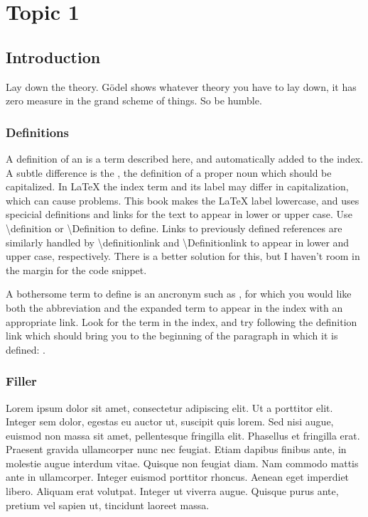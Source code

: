 
\chapter{Topic 1}\label{chap:topic1}

\section{Introduction}\label{sec:topic1-introduction}
Lay down the theory. G{\"o}del shows whatever theory you have to lay down, it has zero measure in the grand scheme of things. So be humble.

\subsection{Definitions}\label{sec:topic1-introduction-definitions}
A definition of an  is a term described here, and automatically added to the index. A subtle difference is the , the definition of a proper noun which should be capitalized. In LaTeX the index term and its label may differ in capitalization, which can cause problems. This book makes the LaTeX label lowercase, and uses specicial definitions and links for the text to appear in lower or upper case. Use \textbackslash definition or \textbackslash Definition to define. Links to previously defined references are similarly handled by \textbackslash definitionlink and \textbackslash Definitionlink to appear in lower and upper case, respectively. There is a better solution for this, but I haven't room in the margin for the code snippet.

A bothersome term to define is an ancronym such as , for which you would like both the abbreviation and the expanded term to appear in the index with an appropriate link. Look for the term in the index, and try following the definition link which should bring you to the beginning of the paragraph in which it is defined: .

\subsection{Filler}\label{sec:topic1-introduction-filler}
Lorem ipsum dolor sit amet, consectetur adipiscing elit. Ut a porttitor elit. Integer sem dolor, egestas eu auctor ut, suscipit quis lorem. Sed nisi augue, euismod non massa sit amet, pellentesque fringilla elit. Phasellus et fringilla erat. Praesent gravida ullamcorper nunc nec feugiat. Etiam dapibus finibus ante, in molestie augue interdum vitae. Quisque non feugiat diam. Nam commodo mattis ante in ullamcorper. Integer euismod porttitor rhoncus. Aenean eget imperdiet libero. Aliquam erat volutpat. Integer ut viverra augue. Quisque purus ante, pretium vel sapien ut, tincidunt laoreet massa.

